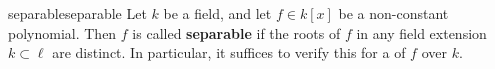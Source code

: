 \begin{topic}{separable}{separable}
    Let $k$ be a field, and let $f \in k[x]$ be a non-constant polynomial. Then $f$ is called \textbf{separable} if the roots of $f$ in any field extension $k \subset \ell$ are distinct. In particular, it suffices to verify this for a  of $f$ over $k$.
\end{topic}
